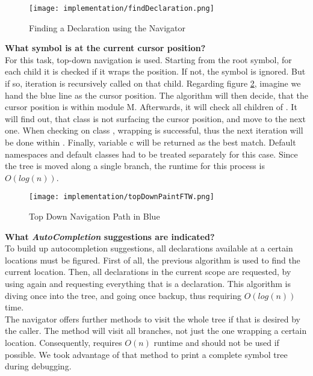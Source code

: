 \begin{figure}[H]
    \centering
    \texttt{[image: implementation/findDeclaration.png]}
    \caption{Finding a Declaration using the Navigator}
    \label{fig:findDecl}
\end{figure}

\textbf{What symbol is at the current cursor position?}\\
For this task, top-down navigation is used.
Starting from the root symbol, for each child it is checked if it wraps the position.
If not, the symbol is ignored.
But if so, iteration is recursively called on that child.
Regarding figure \ref{fig:topDownPaintFTW}, imagine we hand the blue line as the cursor position.
The algorithm will then decide, that the cursor position is within module M.
Afterwards, it will check all children of .
It will find out, that class  is not surfacing the cursor position, and move to the next one.
When checking on class , wrapping is successful, thus the next iteration will be done within .
Finally, variable c will be returned as the best match.
Default namespaces and default classes had to be treated separately for this case.
Since the tree is moved along a single branch, the runtime for this process is $O(log(n))$.\\

\begin{figure}[H]
    \centering
    \texttt{[image: implementation/topDownPaintFTW.png]}
    \caption{Top Down Navigation Path in Blue}
    \label{fig:topDownPaintFTW}
\end{figure}

\textbf{What \textit{AutoCompletion} suggestions are indicated?}\\
To build up autocompletion suggestions, all declarations available at a certain locations must be figured.
First of all, the previous  algorithm is used to find the current location.
Then, all declarations in the current scope are requested, by using  again and requesting everything that is a declaration.
This algorithm is diving once into the tree, and going once backup, thus requiring $O(log(n))$ time.\\

The navigator offers further methods to visit the whole tree if that is desired by the caller.
The method  will visit all branches, not just the one wrapping a certain location.
Consequently,  requires $O(n)$ runtime and should not be used if possible.
We took advantage of that method to print a complete symbol tree during debugging.

